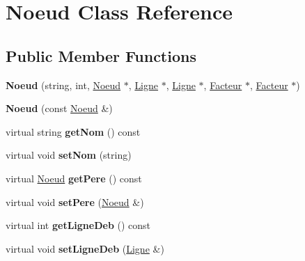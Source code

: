 \hypertarget{class_noeud}{\section{Noeud Class Reference}
\label{class_noeud}
}
\subsection*{Public Member Functions}
\begin{DoxyCompactItemize}
\item 
\hypertarget{class_noeud_a199d747ffdace90b638e389d248dab5f}{{\bfseries Noeud} (string, int, \hyperlink{class_noeud}{Noeud} $\ast$, \hyperlink{class_ligne}{Ligne} $\ast$, \hyperlink{class_ligne}{Ligne} $\ast$, \hyperlink{class_facteur}{Facteur} $\ast$, \hyperlink{class_facteur}{Facteur} $\ast$)}\label{class_noeud_a199d747ffdace90b638e389d248dab5f}

\item 
\hypertarget{class_noeud_a6ef8adab9b819f46787eb30a8bae2e77}{{\bfseries Noeud} (const \hyperlink{class_noeud}{Noeud} \&)}\label{class_noeud_a6ef8adab9b819f46787eb30a8bae2e77}

\item 
\hypertarget{class_noeud_ac6efbbb2f6ce5260eb741de6ac4a4570}{virtual string {\bfseries get\-Nom} () const }\label{class_noeud_ac6efbbb2f6ce5260eb741de6ac4a4570}

\item 
\hypertarget{class_noeud_a784ac2c752bbf779691495bd706c9dff}{virtual void {\bfseries set\-Nom} (string)}\label{class_noeud_a784ac2c752bbf779691495bd706c9dff}

\item 
\hypertarget{class_noeud_a9ebc25e8e9dcc74db5f2de96d135e937}{virtual \hyperlink{class_noeud}{Noeud} {\bfseries get\-Pere} () const }\label{class_noeud_a9ebc25e8e9dcc74db5f2de96d135e937}

\item 
\hypertarget{class_noeud_af918c7824da22b70229a8a8b39eaa416}{virtual void {\bfseries set\-Pere} (\hyperlink{class_noeud}{Noeud} \&)}\label{class_noeud_af918c7824da22b70229a8a8b39eaa416}

\item 
\hypertarget{class_noeud_aa8695f78b8fab2cc333fdedec96d1fcd}{virtual int {\bfseries get\-Ligne\-Deb} () const }\label{class_noeud_aa8695f78b8fab2cc333fdedec96d1fcd}

\item 
\hypertarget{class_noeud_ae5f55210bbb26e61a94359142da71529}{virtual void {\bfseries set\-Ligne\-Deb} (\hyperlink{class_ligne}{Ligne} \&)}\label{class_noeud_ae5f55210bbb26e61a94359142da71529}


\end{DoxyCompactItemize}
